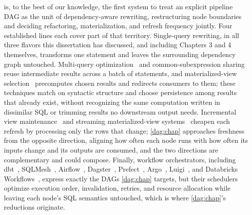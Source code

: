  is, to the best of our knowledge, the first system to
treat an explicit pipeline DAG as the unit of dependency-aware
rewriting, restructuring node boundaries and deciding refactoring,
materialization, and refresh frequency jointly. Four established lines
each cover part of that territory. Single-query rewriting, in all
three flavors this dissertation has discussed, and including
Chapters 3 and 4 themselves, transforms one statement and leaves the
surrounding dependency graph untouched. Multi-query
optimization~\cite{sellis1988multiple,roy2000efficient} and
common-subexpression sharing~\cite{scopeCSE,similarSubexpr} reuse
intermediate results across a batch of statements, and
materialized-view
selection~\cite{agrawal2000automated,harinarayan1996implementing}
precomputes chosen results and redirects consumers to them; these
techniques match on syntactic structure and choose persistence among
results that already exist, without recognizing the same computation
written in dissimilar SQL or trimming results no downstream output
needs. Incremental view maintenance~\cite{ivm} and streaming
materialized-view systems~\cite{materialize,risingwave} cheapen each
refresh by processing only the rows that change; \cref{dag:chap}
approaches freshness from the opposite direction, aligning how often
each node runs with how often its inputs change and its outputs are
consumed, and the two directions are complementary and could compose.
Finally, workflow orchestrators, including dbt~\cite{dbtWhatExactly},
SQLMesh~\cite{sqlmeshOverview}, Airflow~\cite{airflowDags},
Dagster~\cite{dagsterAssets}, Prefect~\cite{prefectTasks},
Argo~\cite{argoDag}, Luigi~\cite{luigiDocs}, and Databricks
Workflows~\cite{databricksJobs}, express exactly the DAGs
\cref{dag:chap} targets, but their schedulers optimize execution
order, invalidation, retries, and resource allocation while leaving
each node's SQL semantics untouched, which is where \cref{dag:chap}'s
reductions originate.
